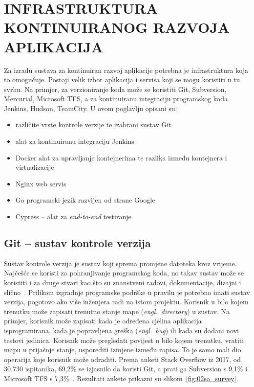 \chapter{INFRASTRUKTURA KONTINUIRANOG RAZVOJA APLIKACIJA}
Za izradu sustava za kontinuiran razvoj aplikacije potrebna je infrastruktura koja to omogućuje.
Postoji velik izbor aplikacija i servisa koji se mogu koristiti u tu svrhu.  Na primjer, za
verzioniranje koda može se koristiti Git, Subversion, Mercurial, Microsoft TFS, a za kontinuiranu
integraciju programskog koda Jenkins, Hudson, TeamCity. U ovom poglavlju opisani su:
\begin{itemize}
    \item različite vrste kontrole verzije te izabrani sustav Git
    \item alat za kontinuiranu integraciju Jenkins
    \item Docker alat za upravljanje kontejnerima te razlika između kontejnera i virtualizacije
    \item Nginx web servis
    \item Go programski jezik razvijen od strane Google
    \item Cypress -- alat za \textit{end-to-end} testiranje.
\end{itemize}

\section{Git -- sustav kontrole verzija}
Sustav kontrole verzija je sustav koji sprema promjene datoteka kroz vrijeme. Najčešće se koristi za
pohranjivanje programskog koda, no takav sustav može se koristiti i za druge stvari kao što su
znanstveni radovi, dokumentacije, dizajni i slično~\citep{perez2016ten}. Prilikom izgradnje
programske podrške u pravilu je potrebno imati sustav verzija, pogotovo ako više inženjera radi na
istom projektu. Korisnik u bilo kojem trenutku može zapisati trenutno stanje mape
(\textit{engl.~directory}) u sustav. Na primjer, korisnik može zapisati kada je određena cjelina
aplikacija isprogramirana, kada je popravljena greška (\textit{engl.~bug}) ili kada su dodani novi
testovi jedinica. Korisnik može pregledati povijest u bilo kojem trenutku, vratiti mapu u prijašnje
stanje, usporediti izmjene između zapisa.  To je samo mali dio operacija koje korisnik može
odraditi.  Prema anketi Stack Overflow iz 2017, od 30.730 ispitanika, 69,2\% se izjasnilo da koristi
Git, a prati ga Subversion s 9,1\% i Microsoft TFS s 7,3\%~\citep{StackOverflow2017Survey}.
Rezultati ankete prikazni su slikom~\ref{fig:02so_survey}.

